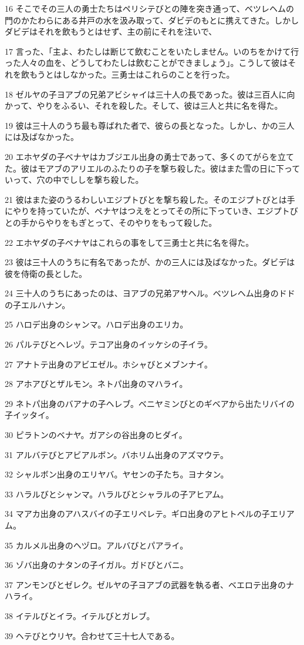 \par 16 そこでその三人の勇士たちはペリシテびとの陣を突き通って、ベツレヘムの門のかたわらにある井戸の水を汲み取って、ダビデのもとに携えてきた。しかしダビデはそれを飲もうとはせず、主の前にそれを注いで、
\par 17 言った、「主よ、わたしは断じて飲むことをいたしません。いのちをかけて行った人々の血を、どうしてわたしは飲むことができましょう」。こうして彼はそれを飲もうとはしなかった。三勇士はこれらのことを行った。
\par 18 ゼルヤの子ヨアブの兄弟アビシャイは三十人の長であった。彼は三百人に向かって、やりをふるい、それを殺した。そして、彼は三人と共に名を得た。
\par 19 彼は三十人のうち最も尊ばれた者で、彼らの長となった。しかし、かの三人には及ばなかった。
\par 20 エホヤダの子ベナヤはカブジエル出身の勇士であって、多くのてがらを立てた。彼はモアブのアリエルのふたりの子を撃ち殺した。彼はまた雪の日に下っていって、穴の中でししを撃ち殺した。
\par 21 彼はまた姿のうるわしいエジプトびとを撃ち殺した。そのエジプトびとは手にやりを持っていたが、ベナヤはつえをとってその所に下っていき、エジプトびとの手からやりをもぎとって、そのやりをもって殺した。
\par 22 エホヤダの子ベナヤはこれらの事をして三勇士と共に名を得た。
\par 23 彼は三十人のうちに有名であったが、かの三人には及ばなかった。ダビデは彼を侍衛の長とした。
\par 24 三十人のうちにあったのは、ヨアブの兄弟アサヘル。ベツレヘム出身のドドの子エルハナン。
\par 25 ハロデ出身のシャンマ。ハロデ出身のエリカ。
\par 26 パルテびとヘレヅ。テコア出身のイッケシの子イラ。
\par 27 アナトテ出身のアビエゼル。ホシャびとメブンナイ。
\par 28 アホアびとザルモン。ネトパ出身のマハライ。
\par 29 ネトパ出身のバアナの子ヘレブ。ベニヤミンびとのギベアから出たリバイの子イッタイ。
\par 30 ピラトンのベナヤ。ガアシの谷出身のヒダイ。
\par 31 アルバテびとアビアルボン。バホリム出身のアズマウテ。
\par 32 シャルボン出身のエリヤバ。ヤセンの子たち。ヨナタン。
\par 33 ハラルびとシャンマ。ハラルびとシャラルの子アヒアム。
\par 34 マアカ出身のアハスバイの子エリペレテ。ギロ出身のアヒトペルの子エリアム。
\par 35 カルメル出身のヘヅロ。アルバびとパアライ。
\par 36 ゾバ出身のナタンの子イガル。ガドびとバニ。
\par 37 アンモンびとゼレク。ゼルヤの子ヨアブの武器を執る者、ベエロテ出身のナハライ。
\par 38 イテルびとイラ。イテルびとガレブ。
\par 39 ヘテびとウリヤ。合わせて三十七人である。

